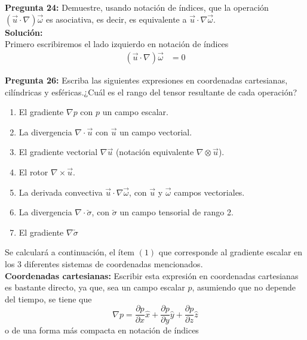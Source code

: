 \documentclass[11pt,letterpaper]{article}
\begin{document}

\textbf{Pregunta 24:} Demuestre, usando notación de índices, que la operación $(\vec{u}\cdot\nabla)\vec{\omega}$ es asociativa, es decir, es equivalente a $\vec{u}\cdot\nabla\vec{\omega}$. \\
\textbf{Solución:} \\
Primero escribiremos el lado izquierdo en notación de índices
\begin{align*}
  (\vec{u}\cdot\nabla)\vec{\omega}  & = 0 
\end{align*}
 

\textbf{Pregunta 26:} Escriba las siguientes expresiones en coordenadas cartesianas, cilíndricas y esféricas.¿Cuál es el rango del tensor resultante de cada operación?
\begin{enumerate}
    \item El gradiente $\nabla p$ con $p$ un campo escalar.
    \item La divergencia $\nabla \cdot \vec{u}$ con $\vec{u}$ un campo vectorial.
    \item El gradiente vectorial $\nabla \vec{u}$ (notación equivalente $\nabla \otimes \vec{u}$).
    \item El rotor $\nabla \times \vec{u}$.
    \item La derivada convectiva $\vec{u}\cdot\nabla\vec{\omega}$, con $\vec{u}$ y $\vec{\omega}$ campos vectoriales.
    \item La divergencia $\nabla \cdot \check{\sigma}$, con $\check{\sigma}$ un campo tensorial de rango 2. 
    \item El gradiente $\nabla\check{\sigma}$
\end{enumerate}
Se calculará a continuación, el ítem $(1)$ que corresponde al gradiente escalar en los 3 diferentes sistemas de coordenadas mencionados. \\
\textbf{Coordenadas cartesianas:} Escribir esta expresión en coordenadas cartesianas es bastante directo, ya que, sea un campo escalar $p$, asumiendo que no depende del tiempo, se tiene que
\begin{equation}
    \nabla p = \frac{\partial p}{\partial x}\hat{x} + \frac{\partial p}{\partial y}\hat{y} + \frac{\partial p}{\partial z}\hat{z} 
\end{equation}
o de una forma más compacta en notación de índices
\end{document}
